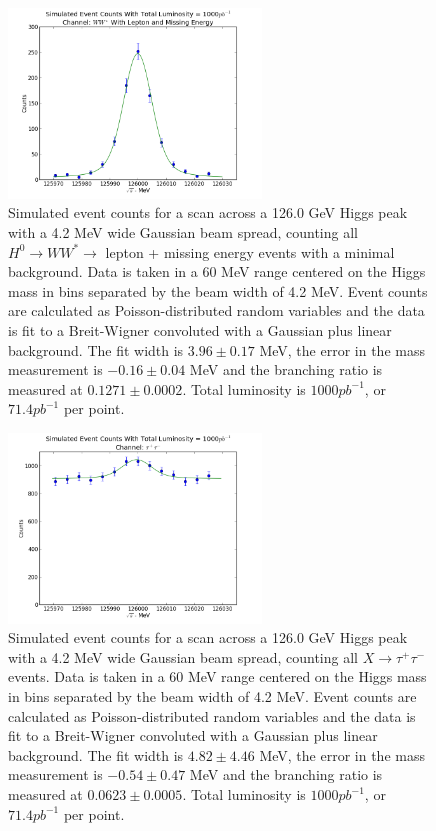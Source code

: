 \documentclass[a4paper]{article}
\begin{document}
\begin{figure}[H]
	\includegraphics[width=0.6\textwidth]{data-fit-ww-cut}
	\caption{Simulated event counts for a scan across a 126.0 GeV Higgs peak with a 4.2 MeV wide Gaussian beam spread, counting all $H^0\rightarrow WW^*\rightarrow$ lepton + missing energy events with a minimal background. Data is taken in a 60 MeV range centered on the Higgs mass in bins separated by the beam width of 4.2 MeV. Event counts are calculated as Poisson-distributed random variables and the data is fit to a Breit-Wigner convoluted with a Gaussian plus linear background. The fit width is $3.96\pm0.17$ MeV, the error in the mass measurement is $-0.16\pm0.04$ MeV and the branching ratio is measured at $0.1271\pm0.0002$. Total luminosity is $1000pb^{-1}$, or $71.4 pb^{-1}$ per point.}
\label{data-fit-ww-cut}
\end{figure}

\begin{figure}[H]
	\includegraphics[width=0.6\textwidth]{data-fit-tt-raw}
	\caption{Simulated event counts for a scan across a 126.0 GeV Higgs peak with a 4.2 MeV wide Gaussian beam spread, counting all $X\rightarrow \tau^+\tau^-$ events. Data is taken in a 60 MeV range centered on the Higgs mass in bins separated by the beam width of 4.2 MeV. Event counts are calculated as Poisson-distributed random variables and the data is fit to a Breit-Wigner convoluted with a Gaussian plus linear background. The fit width is $4.82\pm4.46$ MeV, the error in the mass measurement is $-0.54\pm0.47$ MeV and the branching ratio is measured at $0.0623\pm0.0005$. Total luminosity is $1000pb^{-1}$, or $71.4 pb^{-1}$ per point.}
\label{data-fit-tt-raw}
\end{figure}
\end{document}
